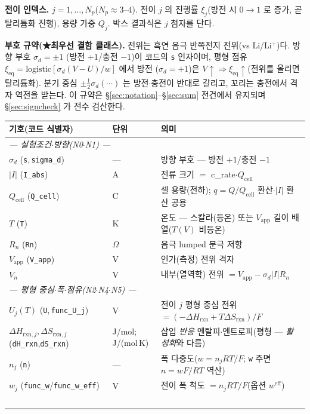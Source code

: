 \documentclass[11pt,a4paper]{article}
\newcommand{\eff}{\mathrm{eff}}
\newcommand{\eq}{\mathrm{eq}}
\newcommand{\app}{\mathrm{app}}
\newcommand{\cell}{\mathrm{cell}}
\newcommand{\rxn}{\mathrm{rxn}}
\newcommand{\code}[1]{\texttt{#1}}
\begin{document}
\textbf{전이 인덱스.} $j=1,\dots,N_p$($N_p\approx3$--$4$). 전이 $j$ 의 진행률 $\xi_j$(방전 시 $0\to1$ 로 증가, 곧 탈리튬화 진행),
용량 가중 $Q_j$. 박스 결과식은 $j$ 첨자를 단다.

\textbf{부호 규약(★최우선 결함 클래스).} 전위는 흑연 음극 반쪽전지 전위(vs Li/Li$^+$)다. 방향 부호 $\sigma_d=\pm1$
(방전 $+1$/충전 $-1$)이 코드의 \code{s} 인자이며, 평형 점유 $\xi_\eq=\mathrm{logistic}[\sigma_d(V-U)/w]$ 에서 방전
($\sigma_d=+1$)은 $V\!\uparrow\Rightarrow\xi_\eq\!\uparrow$(전위를 올리면 탈리튬화). 분기 중심 $\pm\tfrac12\sigma_d(\cdots)$
는 방전$\cdot$충전이 반대로 갈리고, 꼬리는 충전에서 격자 역전을 받는다. 이 규약은 \S\ref{sec:notation}--\S\ref{sec:sum}
전건에서 유지되며 \S\ref{sec:signcheck} 가 전수 검산한다.

\begin{longtable}{p{} p{} p{}}
\toprule 기호(코드 식별자) & 단위 & 의미 \\ \midrule \endhead
\multicolumn{3}{l}{\emph{— 실험조건$\cdot$방향(N0$\cdot$N1) —}}\\
$\sigma_d$ (\code{s},\,\code{sigma\_d}) & --- & 방향 부호 — 방전 $+1$/충전 $-1$ \\
$|I|$ (\code{I\_abs}) & A & 전류 크기 $=$ c\_rate$\cdot Q_\cell$ \\
$Q_\cell$ (\code{Q\_cell}) & C & 셀 용량(전하); $q=Q/Q_\cell$ 환산$\cdot$$|I|$ 환산 공용 \\
$T$ (\code{T}) & K & 온도 — 스칼라(등온) 또는 $V_\app$ 길이 배열($T(V)$ 비등온) \\
$R_n$ (\code{Rn}) & $\Omega$ & 음극 lumped 분극 저항 \\
$V_\app$ (\code{V\_app}) & V & 인가(측정) 전위 격자 \\
$V_n$ & V & 내부(열역학) 전위 $=V_\app-\sigma_d|I|R_n$ \\
\multicolumn{3}{l}{\emph{— 평형 중심$\cdot$폭$\cdot$점유(N2$\cdot$N4$\cdot$N5) —}}\\
$U_j(T)$ (\code{U},\,\code{func\_U\_j}) & V & 전이 $j$ 평형 중심 전위 $=(-\Delta H_\rxn+T\Delta S_\rxn)/F$ \\
$\Delta H_{\rxn,j},\Delta S_{\rxn,j}$ (\code{dH\_rxn},\code{dS\_rxn}) & {\footnotesize J/mol;\,J/(mol\,K)} & 삽입 \emph{반응} 엔탈피$\cdot$엔트로피(평형 — \emph{활성화}와 다름) \\
$n_j$ (\code{n}) & --- & 폭 다중도($w=n_jRT/F$; \code{w} 주면 $n=wF/RT$ 역산) \\
$w_j$ (\code{func\_w}/\code{func\_w\_eff}) & V & 전이 폭 척도 $=n_jRT/F$(옵션 $w^\eff$) \\
$$
\end{longtable}
\end{document}
